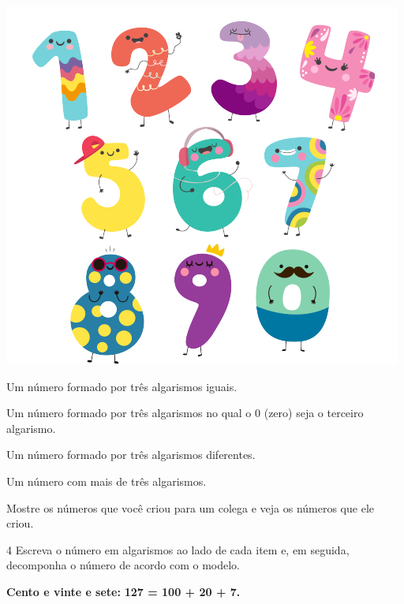 \includegraphics[width=\textwidth]{./media/image4a.png}

\begin{escolha}
\item Um número formado por três algarismos iguais.\\

\item Um número formado por três algarismos no qual o 0 (zero) seja o terceiro algarismo.\\

\item Um número formado por três algarismos diferentes.\\

\item Um número com mais de três algarismos.\\

\item Mostre os números que você criou para um colega e veja os números que ele criou.
\end{escolha}

\num{4} Escreva o número em algarismos ao lado de cada item e, em seguida, decomponha o número de acordo com o modelo.

\begin{myquote}
\begin{center}
\textbf{Cento e vinte e sete:} \textbf{127 = 100 + 20 + 7.}
\end{center}
\end{myquote}

